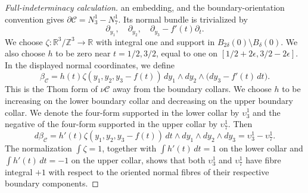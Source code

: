 \documentclass[11pt]{article}
\theoremstyle{remark}\newtheorem{remark}[theorem]{Remark}
\newcommand{\R}{\mathbb R}
\newcommand{\Z}{\mathbb Z}
\begin{document}
\begin{proof}[Full-indeterminacy calculation]
an embedding, and the boundary-orientation convention gives
$\partial\mathcal C=N_3^1-N_7^1$.  Its normal bundle is trivialized by
\[
 \partial_{y_1},\quad\partial_{y_2},\quad
 \partial_{y_3}-f'(t)\partial_t.
\]
We choose $\zeta:\R^3/\Z^3\to\R$ with integral one and support in
$B_{2\delta}(0)\setminus B_\delta(0)$.  We also choose $h$ to be zero near
$t=1/2,3/2$, equal to one on
$[1/2+2\epsilon,3/2-2\epsilon]$.  In the displayed normal coordinates, we define
\begin{equation}\label{eq:explicit-cobordism-form}
 \beta_{\mathcal C}=
 h(t)\zeta(y_1,y_2,y_3-f(t))\,dy_1\wedge dy_2
 \wedge\bigl(dy_3-f'(t)\,dt\bigr).
\end{equation}
This is the Thom form of $\nu\mathcal C$ away from the boundary collars.
We choose $h$ to be increasing on the lower boundary collar and decreasing
on the upper boundary collar.  We denote the four-form supported in the
lower collar by $\upsilon_3^1$ and the negative of the four-form supported
in the upper collar by $\upsilon_7^1$.  Then
\[
 d\beta_{\mathcal C}
 =h'(t)\zeta(y_1,y_2,y_3-f(t))\,
   dt\wedge dy_1\wedge dy_2\wedge dy_3
 =\upsilon_3^1-\upsilon_7^1.
\]
The normalization $\int\zeta=1$, together with
$\int h'(t)\,dt=1$ on the lower collar and
$\int h'(t)\,dt=-1$ on the upper collar, shows that both
$\upsilon_3^1$ and $\upsilon_7^1$ have fibre integral $+1$ with respect to
the oriented normal fibres of their respective boundary components.


\end{proof}
\end{document}
